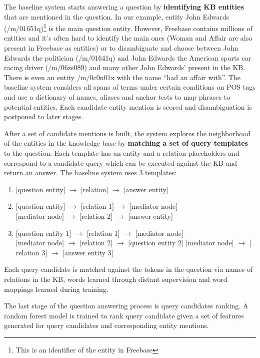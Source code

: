 The baseline system starts answering a question by \textbf{identifying KB entities} that are mentioned in the question.
In our example, entity John Edwards (/m/01651q)\footnote{This is an identifier of the entity in Freebase} is the main question entity.
However, Freebase contains millions of entities and it's often hard to identify the main ones (\eg Woman and Affair are also present in Freebase as entities) or to disambiguate and choose between John Edwards the politician (/m/01641q) and John Edwards the American sports car racing driver (/m/06zs089) and many other John Edwards' present in the KB.
There is even an entity /m/0c0n01x with the name ``had an affair with''.
The baseline system considers all spans of terms under certain conditions on POS tags and use a dictionary of names, aliases and anchor tests \cite{SPITKOVSKY12.266} to map phrases to potential entities.
Each candidate entity mention is scored and disambiguation is postponed to later stages.

After a set of candidate mentions is built, the system explores the neighborhood of the entities in the knowledge base by \textbf{matching a set of query templates} to the question.
Each template has an entity and a relation placeholders and correspond to a candidate query which can be executed against the KB and return an answer.
The baseline system uses 3 templates:
\begin{enumerate}
\item $[$question entity$]$ $\rightarrow$ $[$relation$]$ $\rightarrow$ $[$answer entity$]$
\item $[$question entity$]$ $\rightarrow$ $[$relation 1$]$ $\rightarrow$ $[$mediator node$]$\\
$[$mediator node$]$ $\rightarrow$ $[$relation 2$]$ $\rightarrow$ $[$answer entity$]$
\item $[$question entity 1$]$ $\rightarrow$ $[$relation 1$]$ $\rightarrow$ $[$mediator node$]$\\
$[$mediator node$]$ $\rightarrow$ $[$relation 2$]$ $\rightarrow$ $[$question entity 2$]$
$[$mediator node$]$ $\rightarrow$ $[$relation 3$]$ $\rightarrow$ $[$answer entity 3$]$
\end{enumerate}

Each query candidate is matched against the tokens in the question via names of relations in the KB, words learned through distant supervision and word mappings learned during training.

The last stage of the question answering process is query candidates ranking.
A random forest model is trained to rank query candidate given a set of features generated for query candidates and corresponding entity mentions.


